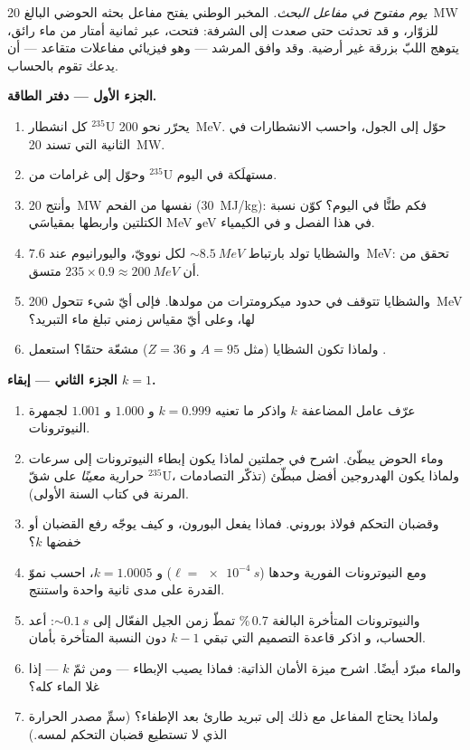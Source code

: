 \begin{problem}\label{pb:b3:nuclear-physics:1}
\emph{يوم مفتوح في مفاعل البحث.} المخبر الوطني
يفتح مفاعل بحثه الحوضي البالغ \qty{20}{MW} للزوّار، و
قد تحدثت حتى صعدت إلى الشرفة: فتحت، عبر ثمانية
أمتار من ماء رائق، يتوهج اللبّ بزرقة غير أرضية. وقد وافق
المرشد --- وهو فيزيائي مفاعلات متقاعد --- أن يدعك
تقوم بالحساب.

\medskip\noindent\textbf{الجزء الأول --- دفتر الطاقة.}

\begin{enumerate}
  \item كل انشطار  $^{235}$U يحرّر نحو \qty{200}{MeV}.
        حوّل إلى الجول، واحسب الانشطارات في الثانية
        التي تسند \qty{20}{MW}.
  \item وحوّل إلى غرامات من $^{235}$U مستهلَكة في اليوم.
  \item وأنتج \qty{20}{MW} نفسها من الفحم (\qty{30}{MJ/kg}): فكم طنًّا
        في اليوم؟ كوّن نسبة الكتلتين واربطها بمقياسَي
        \unit{MeV} و\unit{eV} في هذا الفصل و
        في الكيمياء.
  \item والشظايا تولد بارتباط $\sim\qty{8.5}{MeV}$ لكل
        نوويّ، واليورانيوم عند \qty{7.6}{MeV}: تحقق من أن
        $235\times0.9 \approx \qty{200}{MeV}$ متسق.
  \item والشظايا تتوقف في حدود ميكرومترات من مولدها.
        فإلى أيّ شيء تتحول \qty{200}{MeV} لها، وعلى أيّ
        مقياس زمني تبلغ ماء التبريد؟
  \item ولماذا تكون الشظايا (مثل $A = 95$ و $Z = 36$)
        مشعّة حتمًا؟ استعمل .
\end{enumerate}

\medskip\noindent\textbf{الجزء الثاني --- إبقاء $k = 1$.}

\begin{enumerate}[resume]
  \item عرّف عامل المضاعفة $k$ واذكر ما تعنيه
        $k = 0.999$ و $1.000$ و $1.001$ لجمهرة
        النيوترونات.
  \item وماء الحوض يبطّئ. اشرح في جملتين لماذا يكون إبطاء
        النيوترونات إلى سرعات حرارية \emph{معينًا} على شقّ
        $^{235}$U، ولماذا يكون الهدروجين أفضل مبطّئ
        (تذكّر التصادمات المرنة في كتاب السنة الأولى).
  \item وقضبان التحكم فولاذ بوروني. فماذا يفعل البورون، و
        كيف يوجّه رفع القضبان أو خفضها $k$؟
  \item ومع النيوترونات الفورية وحدها ($\ell = \qty{e-4}{s}$) و
        $k = 1.0005$، احسب نموّ القدرة على مدى ثانية واحدة
        واستنتج.
  \item والنيوترونات المتأخرة البالغة 0.7\,\% تمطّ زمن الجيل
        الفعّال إلى $\sim\qty{0.1}{s}$: أعد الحساب، و
        اذكر قاعدة التصميم التي تبقي $k - 1$ دون
        النسبة المتأخرة بأمان.
  \item والماء مبرّد أيضًا. اشرح ميزة الأمان
        الذاتية: فماذا يصيب الإبطاء --- ومن ثمّ
        $k$ --- إذا غلا الماء كله؟
  \item ولماذا يحتاج المفاعل مع ذلك إلى تبريد طارئ بعد
        الإطفاء؟ (سمِّ مصدر الحرارة الذي لا تستطيع قضبان التحكم
        لمسه.)
\end{enumerate}


\end{problem}
